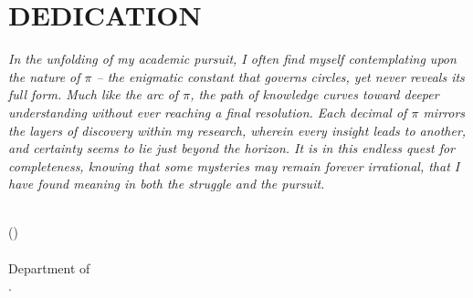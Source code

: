 \chapter*{DEDICATION}
    \def\baselinestretch{1.0}
    \par\textsl{In the unfolding of my academic pursuit, I often find myself contemplating upon the nature of $\pi$ -- the enigmatic constant that governs circles, yet never reveals its full form. Much like the arc of $\pi$, the path of knowledge curves toward deeper understanding without ever reaching a final resolution. Each decimal of $\pi$ mirrors the layers of discovery within my research, wherein every insight leads to another, and certainty seems to lie just beyond the horizon. It is in this endless quest for completeness, knowing that some mysteries may remain forever irrational, that I have found meaning in both the struggle and the pursuit.}
    
    \bigskip\medskip
    \bigskip\medskip
    \bigskip\medskip\bigskip\medskip
    \noindent\\
    \hfill (\authorname)
    \noindent\\
    \hfill {\submissiontime} \\
    \hfill Department of \department\\
    \hfill \university.
